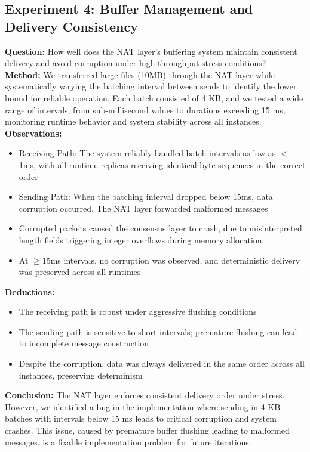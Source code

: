 \documentclass[10pt, 
]{IEEEtran}
\begin{document}
\subsection{Experiment 4: Buffer Management and Delivery Consistency}
\textbf{Question:} How well does the NAT layer's buffering system maintain consistent delivery and avoid corruption under high-throughput stress conditions? \\
\textbf{Method:} We transferred large files (10MB) through the NAT layer while systematically varying the batching interval between sends to identify the lower bound for reliable operation. Each batch consisted of 4 KB, and we tested a wide range of intervals, from sub-millisecond values to durations exceeding 15 ms, monitoring runtime behavior and system stability across all instances. \\
\textbf{Observations:}
\begin{itemize}
    \item Receiving Path: The system reliably handled batch intervals as low as $<$1ms, with all runtime replicas receiving identical byte sequences in the correct order
    \item Sending Path: When the batching interval dropped below 15ms, data corruption occurred. The NAT layer forwarded malformed messages
    \item Corrupted packets caused the consensus layer to crash, due to misinterpreted length fields triggering integer overflows during memory allocation
    \item At $\geq$15ms intervals, no corruption was observed, and deterministic delivery was preserved across all runtimes
\end{itemize}
\textbf{Deductions:}
\begin{itemize}
    \item The receiving path is robust under aggressive flushing conditions
    \item The sending path is sensitive to short intervals; premature flushing can lead to incomplete message construction
    \item Despite the corruption, data was always delivered in the same order across all instances, preserving determinism
\end{itemize}
\textbf{Conclusion:} The NAT layer enforces consistent delivery order under stress. However, we identified a bug in the implementation where sending in 4 KB batches with intervals below 15 ms leads to critical corruption and system crashes. This issue, caused by premature buffer flushing leading to malformed messages, is a fixable implementation problem for future iterations.
\end{document}
